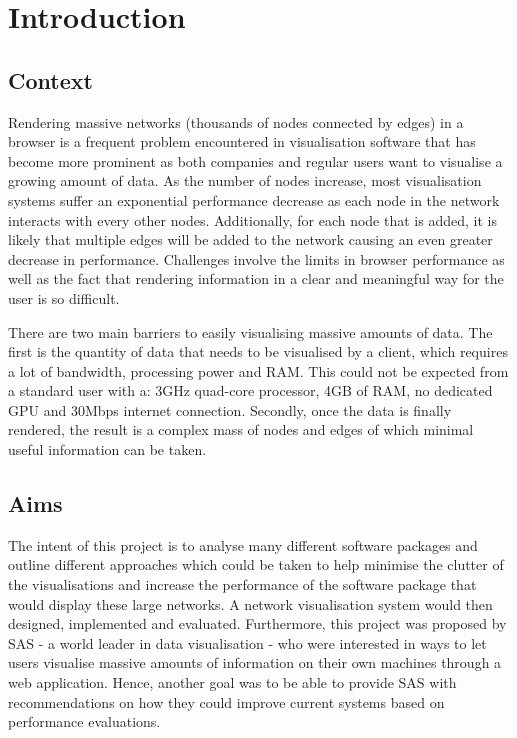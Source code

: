 \documentclass[../dissertation.tex]{subfiles}
\begin{document}
\chapter{Introduction}

\section{Context}

Rendering massive networks (thousands of nodes connected by edges) in a browser is a frequent problem encountered in visualisation software that has become more prominent as both companies and regular users want to visualise a growing amount of data. As the number of nodes increase, most visualisation systems suffer an exponential performance decrease as each node in the network interacts with every other nodes. Additionally, for each node that is added, it is likely that multiple edges will be added to the network causing an even greater decrease in performance. Challenges involve the limits in browser performance as well as the fact that rendering information in a clear and meaningful way for the user is so difficult. 

There are two main barriers to easily visualising massive amounts of data. The first is the quantity of data that needs to be visualised by a client, which requires a lot of bandwidth, processing power and RAM. This could not be expected from a standard user with a: 3GHz quad-core processor, 4GB of RAM, no dedicated GPU and 30Mbps internet connection. Secondly, once the data is finally rendered, the result is a complex mass of nodes and edges of which minimal useful information can be taken. 

\section{Aims}

The intent of this project is to analyse many different software packages and outline different approaches which could be taken to help minimise the clutter of the visualisations and increase the performance of the software package that would display these large networks. A network visualisation system would then designed, implemented and evaluated. Furthermore, this project was proposed by SAS \cite{sas} - a world leader in data visualisation - who were interested in ways to let users visualise massive amounts of information on their own machines through a web application. Hence, another goal was to be able to provide SAS with recommendations on how they could improve current systems based on performance evaluations.
\end{document}
